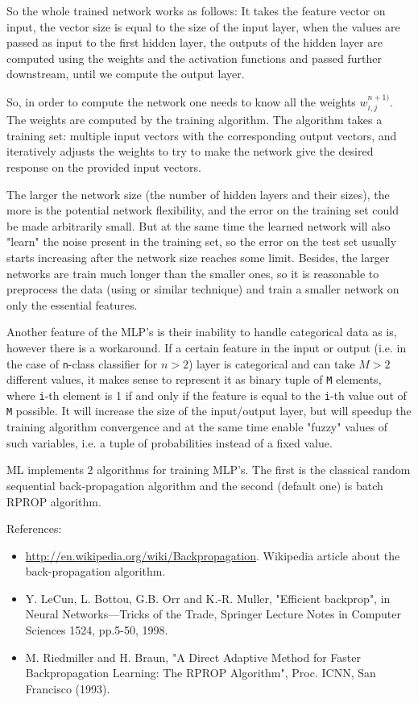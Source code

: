 So the whole trained network works as follows: It takes the feature vector on input, the vector size is equal to the size of the input layer, when the values are passed as input to the first hidden layer, the outputs of the hidden layer are computed using the weights and the activation functions and passed further downstream, until we compute the output layer.

So, in order to compute the network one needs to know all the
weights $w^{n+1)}_{i,j}$. The weights are computed by the training
algorithm. The algorithm takes a training set: multiple input vectors
with the corresponding output vectors, and iteratively adjusts the
weights to try to make the network give the desired response on the
provided input vectors.

The larger the network size (the number of hidden layers and their sizes),
the more is the potential network flexibility, and the error on the
training set could be made arbitrarily small. But at the same time the
learned network will also "learn" the noise present in the training set,
so the error on the test set usually starts increasing after the network
size reaches some limit. Besides, the larger networks are train much
longer than the smaller ones, so it is reasonable to preprocess the data
(using  or similar technique) and train a smaller network
on only the essential features.

Another feature of the MLP's is their inability to handle categorical
data as is, however there is a workaround. If a certain feature in the
input or output (i.e. in the case of \texttt{n}-class classifier for
$n>2$) layer is categorical and can take $M>2$
different values, it makes sense to represent it as binary tuple of
\texttt{M} elements, where \texttt{i}-th element is 1 if and only if the
feature is equal to the \texttt{i}-th value out of \texttt{M} possible. It
will increase the size of the input/output layer, but will speedup the
training algorithm convergence and at the same time enable "fuzzy" values
of such variables, i.e. a tuple of probabilities instead of a fixed value.

ML implements 2 algorithms for training MLP's. The first is the classical
random sequential back-propagation algorithm
and the second (default one) is batch RPROP algorithm.

References:
\begin{itemize}
\item \url{http://en.wikipedia.org/wiki/Backpropagation}. Wikipedia article about the back-propagation algorithm.
\item Y. LeCun, L. Bottou, G.B. Orr and K.-R. Muller, "Efficient backprop", in Neural Networks---Tricks of the Trade, Springer Lecture Notes in Computer Sciences 1524, pp.5-50, 1998.
\item M. Riedmiller and H. Braun, "A Direct Adaptive Method for Faster Backpropagation Learning: The RPROP Algorithm", Proc. ICNN, San Francisco (1993).
\end{itemize}

